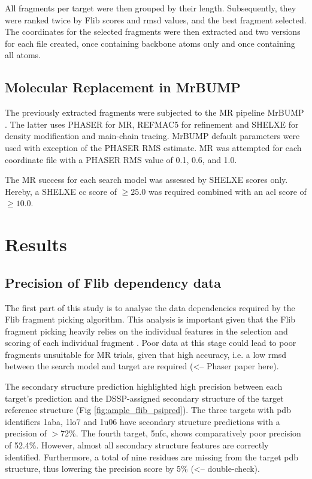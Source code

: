 All fragments per target were then grouped by their length. Subsequently, they were ranked twice by Flib scores and \gls{rmsd} values, and the best fragment selected. The coordinates for the selected fragments were then extracted and two versions for each file created, once containing backbone atoms only and once containing all atoms.

\subsection{Molecular Replacement in MrBUMP}
The previously extracted fragments were subjected to the MR pipeline MrBUMP \cite{Keegan2008-hk}. The latter uses PHASER \cite{McCoy2007-bf} for MR, REFMAC5 \cite{Murshudov2011-we} for refinement and SHELXE \cite{Thorn2013-ir} for density modification and main-chain tracing. MrBUMP default parameters were used with exception of the PHASER RMS estimate. MR was attempted for each coordinate file with a PHASER RMS value of 0.1, 0.6, and 1.0.

The MR success for each search model was assessed by SHELXE scores only. Hereby, a SHELXE \gls{cc} score of $\geq25.0$ was required combined with an \gls{acl} score of $\geq10.0$.


\section{Results}
\subsection{Precision of Flib dependency data}
The first part of this study is to analyse the data dependencies required by the Flib fragment picking algorithm. This analysis is important given that the Flib fragment picking heavily relies on the individual features in the selection and scoring of each individual fragment \cite{De_Oliveira2015-ba}. Poor data at this stage could lead to poor fragments unsuitable for MR trials, given that high accuracy, i.e. a low \gls{rmsd} between the search model and target are required \cite{} (<-- Phaser paper here).

The secondary structure prediction highlighted high precision between each target's prediction and the DSSP-assigned \cite{Frishman1995-ns} secondary structure of the target reference structure (Fig \ref{fig:ample_flib_psipred}). The three targets with \gls{pdb} identifiers 1aba, 1lo7 and 1u06 have secondary structure predictions with a precision of $>72$\%. The fourth target, 5nfc, shows comparatively poor precision of 52.4\%. However, almost all secondary structure features are correctly identified. Furthermore, a total of nine residues are missing from the target \gls{pdb} structure, thus lowering the precision score by 5\% (<-- double-check).

